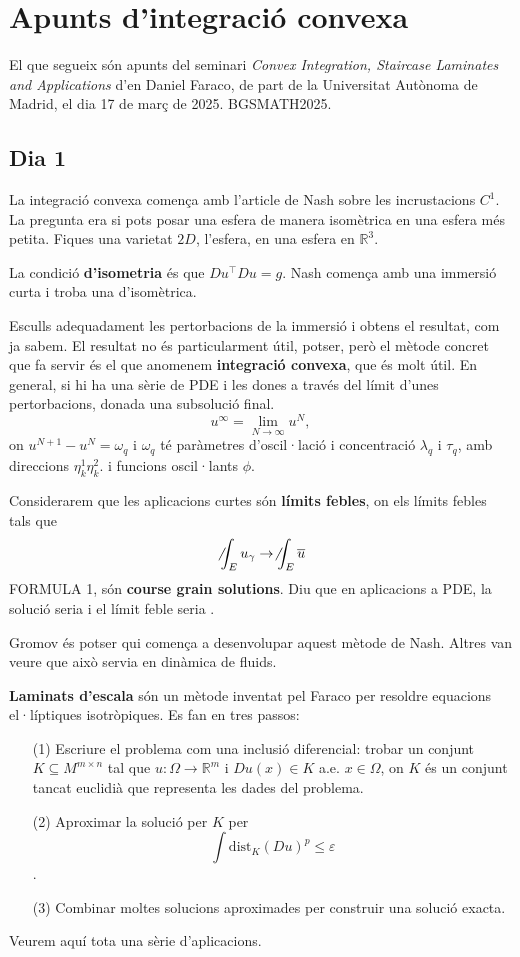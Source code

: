\chapter{Apunts d'integració convexa}
El que segueix són apunts del seminari \textit{Convex Integration, Staircase Laminates and Applications} d'en Daniel Faraco, de part de la Universitat Autònoma de Madrid, el dia 17 de març de 2025. BGSMATH2025.

\section{Dia 1}
La integració convexa comença amb l'article de Nash sobre les incrustacions $C^1$. La pregunta era si pots posar una esfera de manera isomètrica en una esfera més petita. Fiques una varietat $2D$, l'esfera, en una esfera en $\mathbb R^3$. 

La condició \textbf{d'isometria} és que $Du^\intercal Du = g$. Nash comença amb una immersió curta i troba una d'isomètrica. 

Esculls adequadament les pertorbacions de la immersió i obtens el resultat, com ja sabem. El resultat no és particularment útil, potser, però el mètode concret que fa servir és el que anomenem \textbf{integració convexa}, que és molt útil. En general, si hi ha una sèrie de PDE i les dones a través del límit d'unes pertorbacions, donada una subsolució final. 
$$u^\infty = \lim_{N\to\infty} u^N,$$
on $u^{N+1} - u^N = \omega_q$ i $\omega_q$ té paràmetres d'oscil·lació i concentració $\lambda_q$ i $\tau_q$, amb direccions $\eta_k^1\eta_k^2$. i funcions oscil·lants $\phi$.

Considerarem que les aplicacions curtes són \textbf{límits febles}, on els límits febles tals que 
$$\not\int_E u_\gamma \to \not\int_E \overline u$$
FORMULA 1, són \textbf{course grain solutions}. Diu que en aplicacions a PDE, la solució seria  i el límit feble seria .

Gromov és potser qui comença a desenvolupar aquest mètode de Nash. Altres van veure que això servia en dinàmica de fluids. 

\textbf{Laminats d'escala} són un mètode inventat pel Faraco per resoldre equacions el·líptiques isotròpiques. Es fan en tres passos:
\begin{itemize}
    \item[(1)] Escriure el problema com una inclusió diferencial: trobar un conjunt $K\subseteq M^{m\times n}$ tal que $u:\Omega\to\mathbb R^m$ i $Du(x)\in K$ a.e. $x\in\Omega$, on $K$ és un conjunt tancat euclidià que representa les dades del problema.
    \item[(2)] Aproximar la solució per $K$ per $$\int\text{dist}_K(Du)^p\le\varepsilon$$.
    \item[(3)] Combinar moltes solucions aproximades per construir una solució exacta.
\end{itemize}
Veurem aquí tota una sèrie d'aplicacions.

